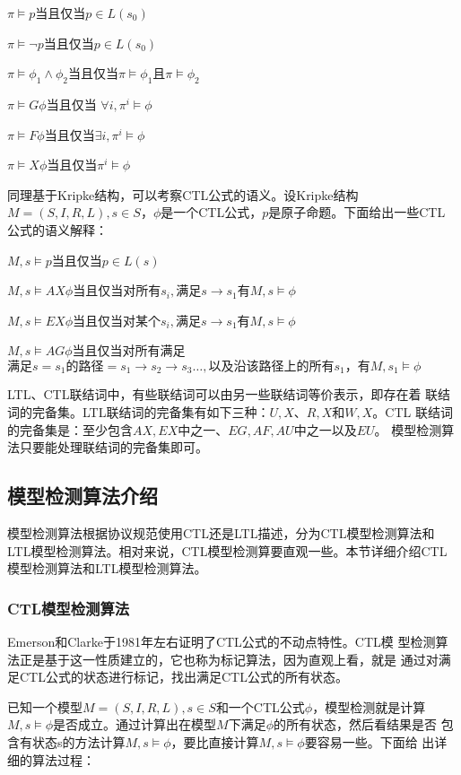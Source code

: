 $\pi \models p$当且仅当$p\in L(s_0)$

$\pi \models \neg p$当且仅当$p\in L(s_0)$

$\pi \models \phi_1 \wedge \phi_2 $当且仅当$\pi \models \phi_1且\pi \models \phi_2$

$\pi \models G\phi $当且仅当 $\forall i ,\pi^i \models \phi$

$\pi \models F\phi $当且仅当$\exists i ,\pi^i \models \phi$

$\pi \models X\phi $当且仅当$\pi^i \models \phi$

同理基于Kripke结构，可以考察CTL公式的语义。设Kripke结构
$M=(S,I,R,L),s\in S$，$\phi$是一个CTL公式，$p$是原子命题。下面给出一些CTL
公式的语义解释：

$M,s \models p$当且仅当$p\in L(s)$

$M,s \models AX\phi$当且仅当对所有$s_i,满足s\rightarrow s_1有M,s\models\phi$

$M,s \models EX\phi$当且仅当对某个$s_i,满足s\rightarrow s_1有M,s\models\phi$

$M,s \models AG\phi$当且仅当对所有满足$满足s= s_1的路径=s_1 \to s_2 \to s_3\ldots,以及沿该路径上的所有s_1，有M,s_1\models\phi$

LTL、CTL联结词中，有些联结词可以由另一些联结词等价表示，即存在着
联结词的完备集。LTL联结词的完备集有如下三种：${U,X}$、${R,X}$和${W,X}$。CTL
联结词的完备集是：至少包含${AX,EX}$中之一、${EG,AF,AU}$中之一以及$EU$。
模型检测算法只要能处理联结词的完备集即可。

\subsection{模型检测算法介绍}
模型检测算法根据协议规范使用CTL还是LTL描述，分为CTL模型检测算法和
LTL模型检测算法。相对来说，CTL模型检测算要直观一些。本节详细介绍CTL
模型检测算法和LTL模型检测算法。

\subsubsection{CTL模型检测算法}

Emerson和Clarke于1981年左右证明了CTL公式的不动点特性。CTL模
型检测算法正是基于这一性质建立的，它也称为标记算法，因为直观上看，就是
通过对满足CTL公式的状态进行标记，找出满足CTL公式的所有状态。

已知一个模型$M=(S,I,R,L),s\in S$和一个CTL公式$\phi$，模型检测就是计算
$M,s\models \phi$是否成立。通过计算出在模型$M$下满足$\phi$的所有状态，然后看结果是否
包含有状态s的方法计算$M,s\models \phi$，要比直接计算$M,s\models \phi$要容易一些。下面给
出详细的算法过程：

